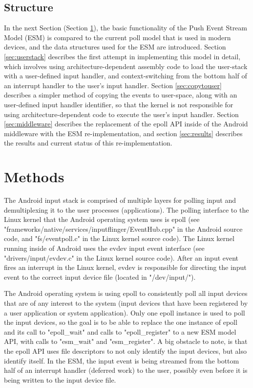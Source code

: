 \documentclass[10pt,journal,compsoc]{IEEEtran}
\begin{document}
\subsection{Structure}
\label{sec:structure}
In the next Section (Section \ref{sec:methods}), the basic functionality of the Push Event Stream Model (ESM) is compared to the current poll model that is used in modern devices, and the data structures used for the ESM are introduced. Section \ref{sec:userstack} describes the first attempt in implementing this model in detail, which involves using architecture-dependent assembly code to load the user-stack with a user-defined input handler, and context-switching from the bottom half of an interrupt handler to the user's input handler. Section \ref{sec:copytouser} describes a simpler method of copying the events to user-space, along with an user-defined input handler identifier, so that the kernel is not responsible for using architecture-dependent code to execute the user's input handler. Section \ref{sec:middleware} describes the replacement of the epoll API inside of the Android middleware with the ESM re-implementation, and section \ref{sec:results} describes the results and current status of this re-implementation.

\section{Methods}
\label{sec:methods}
The Android input stack is comprised of multiple layers for polling input and demultiplexing it to the user processes (applications). The polling interface to the Linux kernel that the Android operating system uses is epoll (see "frameworks/native/services/inputflinger/EventHub.cpp" in the Android source code, and "fs/eventpoll.c" in the Linux kernel source code). The Linux kernel running inside of Android uses the evdev input event interface (see "drivers/input/evdev.c" in the Linux kernel source code). After an input event fires an interrupt in the Linux kernel, evdev is responsible for directing the input event to the correct input device file (located in "/dev/input/").

The Android operating system is using epoll to consistently poll all input devices that are of any interest to the system (input devices that have been registered by a user application or system application). Only one epoll instance is used to poll the input devices, so the goal is to be able to replace the one instance of epoll and its call to "epoll\_wait" and calls to "epoll\_register" to a new ESM model API, with calls to "esm\_wait" and "esm\_register". A big obstacle to note, is that the epoll API uses file descriptors to not only identify the input devices, but also identify itself. In the ESM, the input event is being streamed from the bottom half of an interrupt handler (deferred work) to the user, possibly even before it is being written to the input device file.
\end{document}
